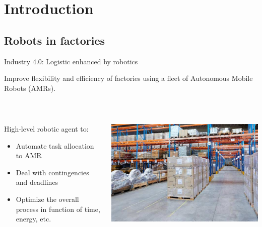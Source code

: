\section{Introduction}
\subsection{Robots in factories}


\begin{frame}{Industry 4.0: Logistic enhanced by robotics}
    \centering

    Improve flexibility and efficiency of factories using a fleet of Autonomous Mobile Robots (AMRs).

    ~~

\begin{columns}
    \begin{column}{0.6\textwidth}
        \pause
        High-level robotic agent to:
        \begin{itemize}
            \pause
            \item Automate task allocation to AMR
            \pause
            \item Deal with contingencies and deadlines
            \pause
            \item Optimize the overall process in function of time, energy, etc.
        \end{itemize}
    \end{column}
    \begin{column}{0.4\textwidth}
        \includegraphics[width = \textwidth]{images/logisticsolutions.jpg}
    \end{column}
\end{columns}
\end{frame}

